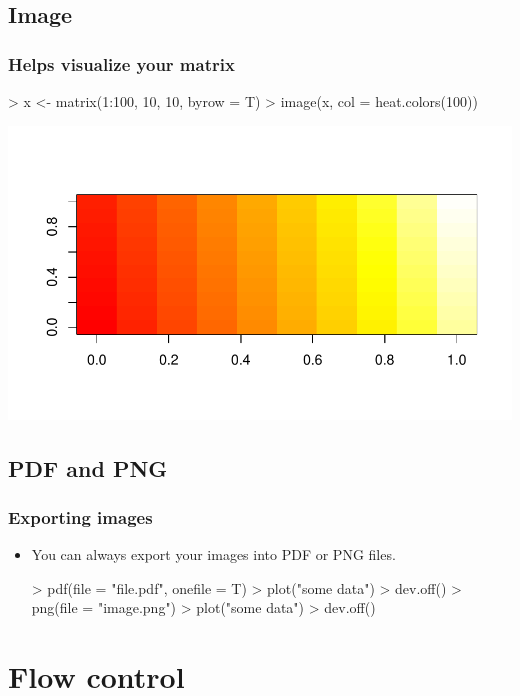 \subsection{Image}

\begin{frame}
  \frametitle{Helps visualize your matrix}
\begin{Schunk}
\begin{Sinput}
> x <- matrix(1:100, 10, 10, byrow = T)
> image(x, col = heat.colors(100))
\end{Sinput}
\end{Schunk}
\includegraphics{plots/figura-031}
\end{frame}

\subsection{PDF and PNG}

\begin{frame}
  \frametitle{Exporting images}
  \begin{itemize}
  \item You can always export your images into PDF or PNG files.
\begin{Schunk}
\begin{Sinput}
> pdf(file = "file.pdf", onefile = T)
> plot("some data")
> dev.off()
> png(file = "image.png")
> plot("some data")
> dev.off()
\end{Sinput}
\end{Schunk}
  \end{itemize}
\end{frame}


\section{Flow control}

